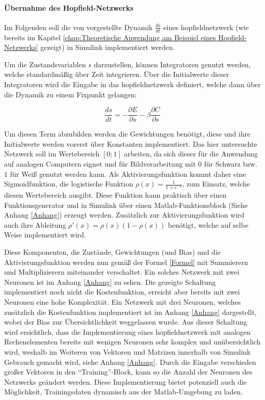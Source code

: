 \paragraph{Übernahme des Hopfield-Netzwerks}
\label{chap:Übernahme des Hopfield-Netzwerks}

Im Folgenden soll die von \citeauthor{Scellier2017} vorgestellte Dynamik \(\frac{ds}{dt}\) eines \gls{hopfieldnetzwerk} (wie bereits im Kapitel \ref{chap:Theoretische Anwendung am Beispiel eines Hopfield-Netzwerks} gezeigt) in Simulink implementiert werden.

Um die Zustandsvariablen \(s\) darzustellen, können Integratoren genutzt werden, welche standardmäßig über Zeit integrieren. Über die Initialwerte dieser Integratoren wird die Eingabe in das \gls{hopfieldnetzwerk} definiert, welche dann über die Dynamik zu einem Fixpunkt gelangen:

\[\frac{ds}{dt}=-\frac{\partial{E}}{\partial{s}}-\beta\frac{\partial{C}}{\partial{s}}\]

Um diesen Term abzubilden werden die Gewichtungen benötigt, diese und ihre Initialwerte werden vorerst über Konstanten implementiert. Das hier untersuchte Netzwerk soll im Wertebereich \([0; 1]\) arbeiten, da sich dieser für die Anwendung auf analogen Computern eignet und für \zb Bildverarbeitung mit \(0\) für Schwarz bzw. \(1\) für Weiß genutzt werden kann. Als Aktivierungsfunktion kommt daher eine Sigmoidfunktion, die logistische Funktion \(\rho(x)=\frac{1}{1+e^{-x}}\), zum Einsatz, welche diesen Wertebereich ausgibt. Diese Funktion kann praktisch über einen Funktionsgenerator und in Simulink über einen Matlab-Funktionsblock (Siehe Anhang \ref{Anhang}) erzeugt werden. Zusätzlich zur Aktivierungsfunktion wird auch ihre Ableitung \(\rho'(x)=\rho(x)(1-\rho(x))\) benötigt, welche auf selbe Weise implementiert wird.

Diese Komponenten, die Zustände, Gewichtungen (und Bias) und die Aktivierungsfunktion werden nun gemäß der Formel \ref{Formel} mit Summierern und Multiplizierern miteinander verschaltet. Ein solches Netzwerk mit zwei Neuronen ist im Anhang \ref{Anhang} zu sehen. Die gezeigte Schaltung implementiert noch nicht die Kostenfunktion, erreicht aber bereits mit zwei Neuronen eine hohe Komplexität. Ein Netzwerk mit drei Neuronen, welches zusätzlich die Kostenfunktion implementiert ist im Anhang \ref{Anhang} dargestellt, wobei der Bias zur Übersichtlichkeit weggelassen wurde. Aus dieser Schaltung wird ersichtlich, dass die Implementierung eines \gls{hopfieldnetzwerk} mit analogen Rechenelementen bereits mit wenigen Neuronen sehr komplex und unübersichtlich wird, weshalb im Weiteren von Vektoren und Matrizen innerhalb von Simulink Gebrauch gemacht wird, siehe Anhang \ref{Anhang}. Durch die Eingabe verschieden großer Vektoren in den "`Training"'-Block, kann so die Anzahl der Neuronen des Netzwerks geändert werden. Diese Implementierung bietet potenziell auch die Möglichkeit, Trainingsdaten dynamisch aus der Matlab-Umgebung zu laden.
